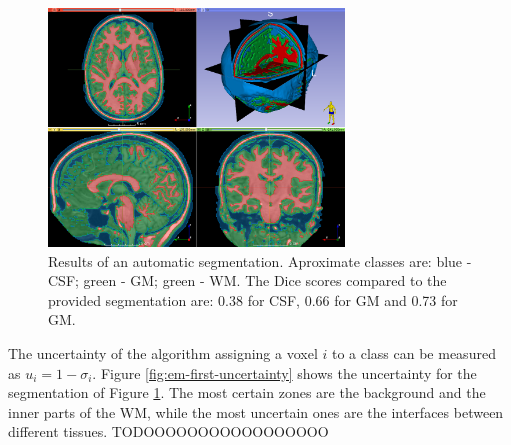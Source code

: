 \begin{figure}
  \centering
  \includegraphics[width=0.7\textwidth]{figures/em_first}
  \caption{Results of an automatic segmentation. Aproximate classes are: blue - CSF; green - GM; green - WM. The Dice scores compared to the provided segmentation are: 0.38 for CSF, 0.66 for GM and 0.73 for GM.}
  \label{fig:em-first}
\end{figure}

The uncertainty of the algorithm assigning a voxel $i$ to a class can be measured as $u_i = 1 - \sigma_i$. Figure \ref{fig:em-first-uncertainty} shows the uncertainty for the segmentation of Figure \ref{fig:em-first}. The most certain zones are the background and the inner parts of the WM, while the most uncertain ones are the interfaces between different tissues. TODOOOOOOOOOOOOOOOOO








